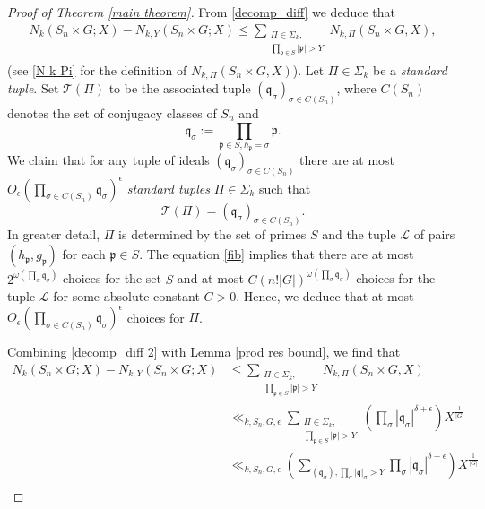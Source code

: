\documentclass[11pt]{amsart}
\newcommand{\fq}{\mathfrak{q}}
\newcommand{\fp}{\mathfrak{p}}
\numberwithin{equation}{section}
\begin{document}
\begin{proof}[Proof of Theorem \ref{main theorem}]
     
    From \eqref{decomp_diff} we deduce that
\begin{equation}\label{decomp_diff 2}
    \begin{split}
        N_{k}(S_n\times G; X)-N_{k, Y}(S_n\times G; X) \leq \sum_{\substack{\Pi \in \Sigma_k,\\ \prod_{\fp \in S}|\fp| > Y}} N_{k,\Pi}(S_n\times G, X),
    \end{split}
\end{equation}
(see \eqref{N k Pi} for the definition of $N_{k,\Pi}(S_n\times G, X)$). Let $\Pi \in \Sigma_k$ be a \textit{standard tuple}. Set $\mathcal{T}(\Pi)$ to be the associated tuple $(\fq_\sigma)_{\sigma \in C(S_n)}$, where $C(S_n)$ denotes the set of conjugacy classes of $S_n$ and \[\fq_\sigma := \prod_{\fp \in S, h_{\fp} = \sigma}\fp.\]We claim that for any tuple of ideals $(\fq_\sigma)_{\sigma \in C(S_n)}$ there are at most $O_{\epsilon}(\prod_{\sigma \in C(S_n)}\fq_\sigma)^{\epsilon} $ \textit{standard tuples} $\Pi\in \Sigma_k$ such that
\begin{equation}\label{fib}
    \mathcal{T}(\Pi)=(\fq_\sigma)_{\sigma \in C(S_n)}.
\end{equation}In greater detail, $\Pi$ is determined by the set of primes $S$ and the tuple $\mathcal{L}$ of pairs $(h_{\fp}, g_{\fp})$ for each $\fp \in S$. The equation \eqref{fib} implies that there are at most $2^{\omega(\prod_\sigma \fq_\sigma)}$ choices for the set $S$ and at most $C (n!|G|)^{\omega(\prod_\sigma \fq_\sigma)}$ choices for the tuple $\mathcal{L}$ for some absolute constant $C > 0$. Hence, we deduce that at most $O_{\epsilon}(\prod_{\sigma \in C(S_n)}\fq_\sigma)^{\epsilon} $ choices for $\Pi$.
\par Combining \eqref{decomp_diff 2} with Lemma \ref{prod res bound}, we find that
\begin{equation*}
    \begin{split}
        N_{k}(S_n\times G; X)-N_{k, Y}(S_n\times G; X) &\leq \sum_{\substack{\Pi \in \Sigma_k,\\ \prod_{\fp \in S}|\fp| > Y}} N_{k,\Pi}(S_n\times G, X)\\
         &\ll_{k,S_n,G,\epsilon} \sum_{\substack{\Pi \in \Sigma_k,\\ \prod_{\fp \in S}|\fp| > Y}} \left(\prod_{\sigma}|\fq_\sigma|^{\delta+\epsilon}\right)X^{\frac{1}{|G|}}\\
         &\ll_{k,S_n,G,\epsilon} \left(\sum_{(\fq_\sigma), \prod_{\sigma}|\fq|_\sigma > Y}\prod_{\sigma}|\fq_\sigma|^{\delta+\epsilon}\right) X^{\frac{1}{|G|}}\\

\end{split}
\end{equation*}
\end{proof}
\end{document}
